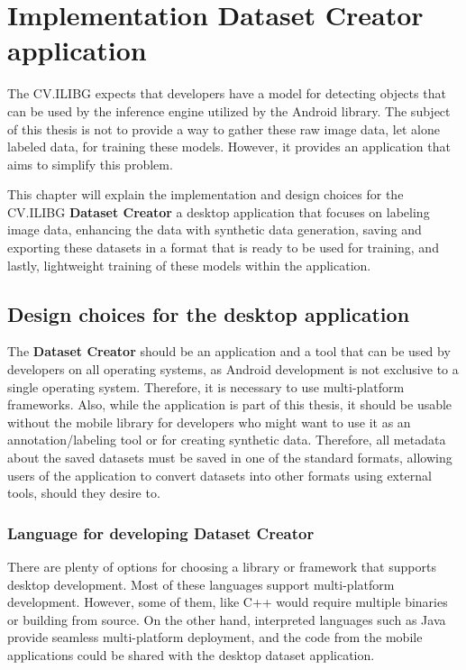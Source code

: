 
\chapter{Implementation Dataset Creator application}
The CV.ILIBG expects that developers have a model for detecting objects that can be used by the inference engine utilized by the Android library. The subject of this thesis is not to provide a way to gather these raw image data, let alone labeled data, for training these models. However, it provides an application that aims to simplify this problem.

This chapter will explain the implementation and design choices for the CV.ILIBG \textbf{Dataset Creator} a desktop application that focuses on labeling image data, enhancing the data with synthetic data generation, saving and exporting these datasets in a format that is ready to be used for training, and lastly, lightweight training of these models within the application.




\section{Design choices for the desktop application}
The \textbf{Dataset Creator} should be an application and a tool that can be used by developers on all operating systems, as Android development is not exclusive to a single operating system. Therefore, it is necessary to use multi-platform frameworks. Also, while the application is part of this thesis, it should be usable without the mobile library for developers who might want to use it as an annotation/labeling tool or for creating synthetic data. Therefore, all metadata about the saved datasets must be saved in one of the standard formats, allowing users of the application to convert datasets into other formats using external tools, should they desire to.

\subsection{Language for developing \textbf{Dataset Creator}}
There are plenty of options for choosing a library or framework that supports desktop development. Most of these languages support multi-platform development. However, some of them, like C++ would require multiple binaries or building from source. On the other hand, interpreted languages such as Java provide seamless multi-platform deployment, and the code from the mobile applications could be shared with the desktop dataset application. 

